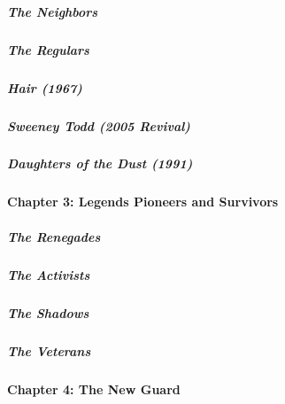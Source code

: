 \href{/interactive/2020/04/13/t-magazine/ninth-street-greenwich-village-neighbors.html}{}

\hypertarget{the-neighbors}{%
\subparagraph{The Neighbors}\label{the-neighbors}}

\href{/interactive/2020/04/13/t-magazine/omen-restaurant-nyc.html}{}

\hypertarget{the-regulars}{%
\subparagraph{The Regulars}\label{the-regulars}}

\href{/interactive/2020/04/13/t-magazine/hair-musical-broadway.html}{}

\hypertarget{hair-1967}{%
\subparagraph{Hair (1967)}\label{hair-1967}}

\href{/interactive/2020/04/13/t-magazine/sweeney-todd-revival.html}{}

\hypertarget{sweeney-todd-2005-revival}{%
\subparagraph{Sweeney Todd (2005
Revival)}\label{sweeney-todd-2005-revival}}

\href{/interactive/2020/04/13/t-magazine/daughters-of-the-dust.html}{}

\hypertarget{daughters-of-the-dust-1991}{%
\subparagraph{Daughters of the Dust
(1991)}\label{daughters-of-the-dust-1991}}

\hypertarget{chapter-3-legends-pioneers-and-survivors}{%
\paragraph{Chapter 3: Legends Pioneers and
Survivors}\label{chapter-3-legends-pioneers-and-survivors}}

\href{/interactive/2020/04/13/t-magazine/butch-stud-lesbian.html}{}

\hypertarget{the-renegades}{%
\subparagraph{The Renegades}\label{the-renegades}}

\href{/interactive/2020/04/13/t-magazine/act-up-aids.html}{}

\hypertarget{the-activists}{%
\subparagraph{The Activists}\label{the-activists}}

\href{/interactive/2020/04/13/t-magazine/artist-recluse.html}{}

\hypertarget{the-shadows}{%
\subparagraph{The Shadows}\label{the-shadows}}

\href{/interactive/2020/04/13/t-magazine/black-actresses-bassett-berry-blige-henson-whitfield-elise.html}{}

\hypertarget{the-veterans}{%
\subparagraph{The Veterans}\label{the-veterans}}

\hypertarget{chapter-4-the-new-guard}{%
\paragraph{Chapter 4: The New Guard}\label{chapter-4-the-new-guard}}

